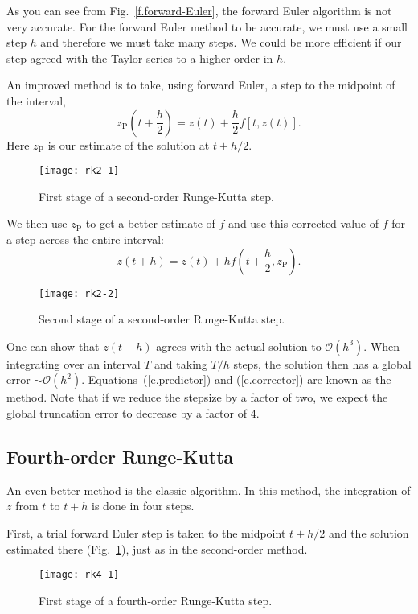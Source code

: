 As you can see from Fig.~\ref{f.forward-Euler}, the forward Euler algorithm is not very accurate.
For the forward Euler method to be accurate, we must use a small step $h$ and therefore we must take many steps. We could be more efficient if our step agreed with the Taylor series to a higher order in $h$.

An improved method is to take, using forward Euler, a step to the midpoint of the interval,
\begin{equation}\label{e.predictor}
z_{\mathrm{P}}\left(t+\frac{h}{2}\right) = z(t) + \frac{h}{2}f[t,z(t)].
\end{equation}
Here $z_{\mathrm{P}}$ is our estimate of the solution at $t+h/2$.
\begin{figure}
\texttt{[image: rk2-1]}
\caption{First stage of a second-order Runge-Kutta step.}
\end{figure}

We then use $z_{\mathrm{P}}$ to get a better estimate of $f$ and use this corrected value of $f$ for a step across the entire interval:
\begin{equation}\label{e.corrector}
z(t+h) = z(t) + h f\left(t+\frac{h}{2},z_{\mathrm{P}}\right).
\end{equation}
\begin{figure}
\texttt{[image: rk2-2]}
\caption{Second stage of a second-order Runge-Kutta step.}
\end{figure}

One can show that $z(t+h)$ agrees with the actual solution to $\mathcal{O}(h^{3})$. When integrating over an interval $T$ and taking $T/h$ steps, the solution then has a global error $\sim\mathcal{O}(h^{2})$.  Equations~(\ref{e.predictor}) and (\ref{e.corrector}) are known as the  method. Note that if we reduce the stepsize by a factor of two, we expect the global truncation error to decrease by a factor of 4.

\subsection{Fourth-order Runge-Kutta}

An even better method is the classic  algorithm. In this method, the integration of $z$ from $t$ to $t+h$ is done in four steps. 

First, a trial forward Euler step is taken to the midpoint $t+h/2$ and the solution estimated there (Fig.~\ref{f.rk4-1}), just as in the second-order method.
\begin{figure}
\texttt{[image: rk4-1]}
\caption{First stage of a fourth-order Runge-Kutta step.\label{f.rk4-1}}
\end{figure}


